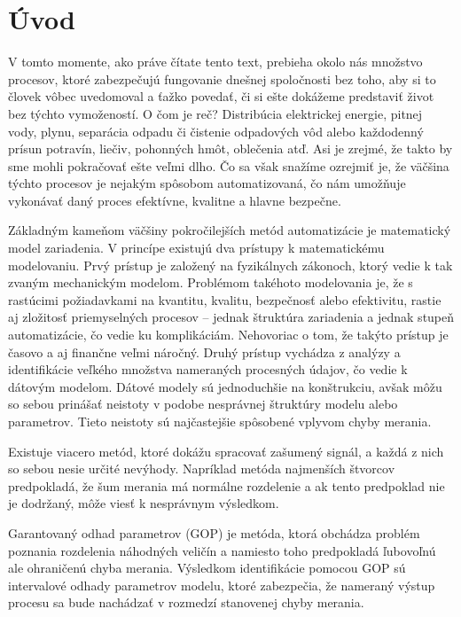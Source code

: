 \chapter*{Úvod}

V tomto momente, ako práve čítate tento text, prebieha okolo nás množstvo procesov, ktoré zabezpečujú fungovanie dnešnej spoločnosti bez toho, aby si to človek vôbec uvedomoval a ťažko povedať, či si ešte dokážeme predstaviť život bez týchto vymožeností. O čom je reč? Distribúcia elektrickej energie, pitnej vody, plynu, separácia 
odpadu či čistenie odpadových vôd alebo každodenný prísun potravín,
liečiv, pohonných hmôt, oblečenia atď. Asi je zrejmé, že takto by sme mohli pokračovať ešte veľmi dlho. Čo sa však snažíme ozrejmiť je, že väčšina týchto procesov je nejakým spôsobom automatizovaná, čo nám umožňuje vykonávať daný proces efektívne, kvalitne a hlavne bezpečne. 

Základným kameňom väčšiny pokročilejších metód automatizácie je matematický model zariadenia. V princípe existujú dva prístupy k matematickému modelovaniu. Prvý prístup je založený na fyzikálnych zákonoch, ktorý vedie k tak zvaným mechanickým modelom. Problémom takéhoto modelovania je, že s rastúcimi požiadavkami na kvantitu, kvalitu, bezpečnosť alebo efektivitu, rastie aj zložitosť priemyselných procesov
-- jednak štruktúra zariadenia a jednak stupeň automatizácie, 
čo vedie ku komplikáciám. Nehovoriac o tom, že takýto prístup je časovo a aj finančne veľmi náročný. Druhý prístup vychádza z analýzy a identifikácie veľkého množstva nameraných procesných údajov, čo vedie k dátovým modelom. Dátové modely sú jednoduchšie na konštrukciu, avšak môžu so sebou prinášať neistoty v podobe nesprávnej štruktúry modelu alebo parametrov. Tieto neistoty sú najčastejšie spôsobené vplyvom chyby merania.

Existuje viacero metód, ktoré dokážu spracovať zašumený signál, a každá z nich so sebou nesie určité nevýhody. Napríklad metóda najmenších štvorcov predpokladá, že šum merania má normálne rozdelenie a ak tento predpoklad nie je dodržaný, môže viesť k nesprávnym výsledkom.

Garantovaný odhad parametrov (GOP) je metóda, ktorá obchádza problém poznania rozdelenia náhodných veličín a namiesto toho predpokladá ľubovoľnú ale ohraničenú chyba merania. Výsledkom identifikácie pomocou GOP sú intervalové odhady parametrov modelu, ktoré zabezpečia, že nameraný výstup procesu sa bude nachádzať v rozmedzí stanovenej chyby merania.  

